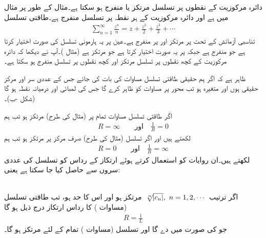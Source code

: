 دائرہ مرکوزیت کے نقطوں پر تسلسل مرتکز یا منفرج ہو سکتا ہے۔مثال کے طور پر مثال   میں  ہے اور دائرہ مرکوزیت  کے ہر نقطہ پر  تسلسل منفرج ہے۔طاقتی تسلسل
\begin{align*}
\sum\limits_{n=1}^{\infty} \frac{z^n}{n}=z+\frac{z^2}{2}+\frac{z^3}{3}+\cdots
\end{align*}
تناسبی آزمائش کے تحت  پر مرتکز اور  پر منفرج ہے۔عین  پر یہ ہارمونی تسلسل کی صورت اختیار کرتا ہے جو منفرج ہے جبکہ  پر یہ  صورت اختیار کرتا ہے جو مرتکز ہے (مثال )۔آپ نے دیکھا کہ دائرہ مرکوزیت کے کچھ نقطوں پر تسلسل مرتکز اور کچھ نقطوں پر تسلسل منفرج ہو سکتا ہے۔

ظاہر ہے کہ اگر ہم حقیقی طاقتی تسلسل مساوات  کی بات کی جائے جس کے عددی سر اور مرکز حقیقی ہوں اور  متغیرہ  ہو تب  محور پر  مساوات    کو ظاہر کرے گا جس کی لمبائی  اور درمیانہ نقطہ  ہو گا (شکل -ب)۔

اگر طاقتی تسلسل مساوات  تمام  پر (مثال  کی طرح) مرتکز ہو تب ہم
\begin{align*}
R=\infty\quad \quad \text{اور}\quad \frac{1}{R}=0
\end{align*} 
لکھتے ہیں اور اگر تسلسل (مثال  کی طرح) صرف مرکز  پر مرتکز ہو تب ہم
\begin{align*}
R=0\quad \quad \text{اور}\quad \frac{1}{R}=\infty
\end{align*}
لکھتے ہیں۔ان روایات کو استعمال کرتے ہوئے ارتکاز کے رداس  کو تسلسل کی عددی سروں سے حاصل کیا جا سکتا ہے یعنی:

\quad {}\\
اگر ترتیب
$\,\sqrt[\leftroot{-2}n]{\abs{c_n}},\,\, n=1,2,\cdots\,$
مرتکز ہو اور اس کا حد  ہو، تب طاقتی تسلسل (مساوات ) کا رداس ارتکاز  درج ذیل ہو گا
\begin{align}\label{مساوات_ٹیلر_رداس_ارتکاز_الف}
R=\frac{1}{L}
\end{align}
جو  کی صورت میں  دے گا اور تسلسل  (مساوات ) تمام  کے لئے مرتکز ہو گا۔


